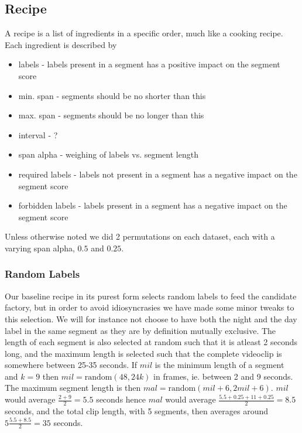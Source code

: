 \subsection{Recipe}
%
A recipe is a list of ingredients in a specific order, much like a cooking recipe. Each ingredient is described by
\begin{itemize}
\item labels - labels present in a segment has a positive impact on the segment score
\item min. span - segments should be no shorter than this
\item max. span - segments should be no longer than this
\item interval - ?
\item span alpha - weighing of labels vs. segment length
\item required labels - labels not present in a segment has a negative impact on the segment score
\item forbidden labels - labels present in a segment has a negative impact on the segment score
\end{itemize}
Unless otherwise noted we did 2 permutations on each dataset, each with a varying span alpha, $0.5$ and $0.25$.
%
\subsubsection{Random Labels}
% 
Our baseline recipe in its purest form selects random labels to feed the candidate factory, but in order to avoid idiosyncrasies we have made some minor tweaks to this selection. We will for instance not choose to have both the night and the day label in the same segment as they are by definition mutually exclusive. The length of each segment is also selected at random such that it is atleast 2 seconds long, and the maximum length is selected such that the complete videoclip is somewhere between 25-35 seconds. If $mil$ is the minimum length of a segment and $k=9$ then $mil=\text{random}(48,24k)$ in frames, ie. between 2 and 9 seconds. The maximum segment length is then $mal=\text{random}(mil+6, 2mil+6)$. $mil$ would average $\frac{2+9}{2}=5.5$ seconds hence $mal$ would average $\frac{5.5+0.25+11+0.25}{2}=8.5$ seconds, and the total clip length, with 5 segments, then averages around $5\frac{5.5+8.5}{2}=35$ seconds.
%
